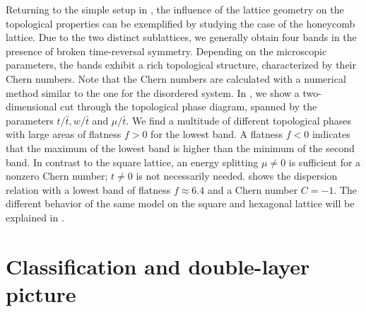 
Returning to the simple setup in , the influence of the lattice geometry on the topological properties can be exemplified by studying the case of the honeycomb lattice.
Due to the two distinct sublattices, we generally obtain four bands in the presence of broken time-reversal symmetry.
Depending on the microscopic parameters, the bands exhibit a rich topological structure, characterized by their Chern numbers.
Note that the Chern numbers are calculated with a numerical method similar to the one for the disordered system.
In , we show a two-dimensional cut through the topological phase diagram, spanned by the parameters $t/\bar{t}, w/\bar{t}$ and $\mu/\bar{t}$.
We find a multitude of different topological phases with large areas of flatness $f > 0$ for the lowest band.
A flatness $f < 0$ indicates that the maximum of the lowest band is higher than the minimum of the second band.
In contrast to the square lattice, an energy splitting $\mu \ne 0$ is sufficient for a nonzero Chern number; $t\ne 0$ is not necessarily needed.
 shows the dispersion relation with a lowest band of flatness $f\approx 6.4$ and a Chern number $C=-1$.
The different behavior of the same model on the square and hexagonal lattice will be explained in .

\section{Classification and double-layer picture}


